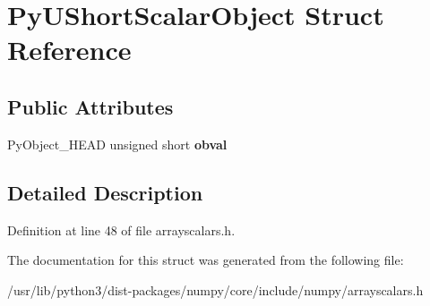 \hypertarget{structPyUShortScalarObject}{}\section{Py\+U\+Short\+Scalar\+Object Struct Reference}
\label{structPyUShortScalarObject}
\subsection*{Public Attributes}
\begin{DoxyCompactItemize}
\item 
Py\+Object\+\_\+\+H\+E\+AD unsigned short {\bfseries obval}\hypertarget{structPyUShortScalarObject_aa415447f5b75742410c88f9257172377}{}\label{structPyUShortScalarObject_aa415447f5b75742410c88f9257172377}

\end{DoxyCompactItemize}


\subsection{Detailed Description}


Definition at line 48 of file arrayscalars.\+h.



The documentation for this struct was generated from the following file\+:\begin{DoxyCompactItemize}
\item 
/usr/lib/python3/dist-\/packages/numpy/core/include/numpy/arrayscalars.\+h\end{DoxyCompactItemize}
